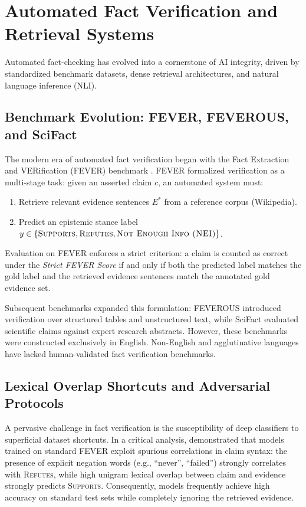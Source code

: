 \section{Automated Fact Verification and Retrieval Systems}
\label{sec:rel_fact_verification}

Automated fact-checking has evolved into a cornerstone of AI integrity, driven by standardized benchmark datasets, dense retrieval architectures, and natural language inference (NLI).

\subsection{Benchmark Evolution: FEVER, FEVEROUS, and SciFact}
The modern era of automated fact verification began with the Fact Extraction and VERification (FEVER) benchmark \citep{thorne2018fever}. FEVER formalized verification as a multi-stage task: given an asserted claim $c$, an automated system must:
\begin{enumerate}
    \item Retrieve relevant evidence sentences $E^*$ from a reference corpus (Wikipedia).
    \item Predict an epistemic stance label $y \in \{\textsc{Supports}, \textsc{Refutes}, \textsc{Not Enough Info (NEI)}\}$.
\end{enumerate}
Evaluation on FEVER enforces a strict criterion: a claim is counted as correct under the \textit{Strict FEVER Score} if and only if both the predicted label matches the gold label and the retrieved evidence sentences match the annotated gold evidence set.

Subsequent benchmarks expanded this formulation: FEVEROUS \citep{aly2021feverous} introduced verification over structured tables and unstructured text, while SciFact \citep{wadden2020fact} evaluated scientific claims against expert research abstracts. However, these benchmarks were constructed exclusively in English. Non-English and agglutinative languages have lacked human-validated fact verification benchmarks.

\subsection{Lexical Overlap Shortcuts and Adversarial Protocols}
A pervasive challenge in fact verification is the susceptibility of deep classifiers to superficial dataset shortcuts. In a critical analysis, \citet{schuster2019fever} demonstrated that models trained on standard FEVER exploit spurious correlations in claim syntax: the presence of explicit negation words (e.g., ``never'', ``failed'') strongly correlates with \textsc{Refutes}, while high unigram lexical overlap between claim and evidence strongly predicts \textsc{Supports}. Consequently, models frequently achieve high accuracy on standard test sets while completely ignoring the retrieved evidence.

